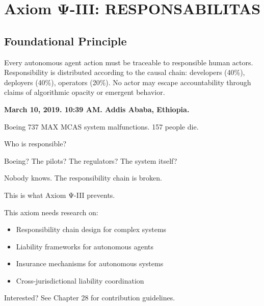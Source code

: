 
\chapter{Axiom Ψ-III: RESPONSABILITAS}
\label{ch:axiom-III}

\section*{Foundational Principle}

\begin{principlebox}
Every autonomous agent action must be traceable to responsible human actors. Responsibility is distributed according to the causal chain: developers (40\%), deployers (40\%), operators (20\%). No actor may escape accountability through claims of algorithmic opacity or emergent behavior.
\end{principlebox}

\vspace{0.5cm}

\begin{tcolorbox}[colback=lightgray, colframe=legislativeblue, title=\textbf{📖 Why This Axiom Matters}]
\textbf{March 10, 2019. 10:39 AM. Addis Ababa, Ethiopia.}

Boeing 737 MAX MCAS system malfunctions. 157 people die.

Who is responsible?

Boeing? The pilots? The regulators? The system itself?

Nobody knows. The responsibility chain is broken.

This is what Axiom Ψ-III prevents.
\end{tcolorbox}

\vspace{0.5cm}

\begin{tcolorbox}[colback=lightgray, colframe=accentgold, title=\textbf{🎯 Contribution Opportunity}]
This axiom needs research on:
\begin{itemize}
    \item Responsibility chain design for complex systems
    \item Liability frameworks for autonomous agents
    \item Insurance mechanisms for autonomous systems
    \item Cross-jurisdictional liability coordination
\end{itemize}

Interested? See Chapter 28 for contribution guidelines.
\end{tcolorbox}

